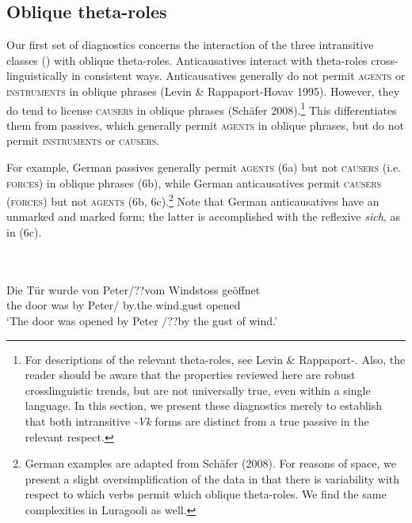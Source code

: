 \documentclass[output=paper]{langsci/langscibook}
\begin{document}
\subsection{Oblique theta-roles} %

Our first set of diagnostics concerns the interaction of the three intransitive classes () with oblique theta-roles. Anticausatives interact with theta-roles cross-linguistically in consistent ways. Anticausatives generally do not permit \textsc{agents }or \textsc{instruments }in oblique phrases (Levin \& Rappaport-Hovav 1995). However, they do tend to license \textsc{causers} in oblique phrases (Schäfer 2008).\footnote{ For descriptions of the relevant theta-roles, see Levin \& Rappaport-\citet{Hovav1995}. Also, the reader should be aware that the properties reviewed here are robust crosslinguistic trends, but are not universally true, even within a single language. In this section, we present these diagnostics merely to establish that both intransitive \textit{-Vk} forms are distinct from a true passive in the relevant respect.} This differentiates them from passives, which generally permit \textsc{agents} in oblique phrases, but do not permit \textsc{instruments }or \textsc{causers}.

For example, German passives generally permit \textsc{agents (6}a) but not \textsc{causers (}i.e. \textsc{forces}) in oblique phrases\textsc{ }(6b), while German anticausatives permit \textsc{causers} (\textsc{forces}) but not \textsc{agents }(6b, 6c).\footnote{{ }German examples are adapted from Schäfer (2008). For reasons of space, we present a slight oversimplification of the data in that there is variability with respect to which verbs permit which oblique theta-roles. We find the same complexities in Luragooli as well.}\textsuperscript{  }Note that German anticausatives have an unmarked and marked form; the latter is accomplished with the reflexive \textit{sich}, as in (6c).

\ea\label{exx:}
{}\\
\ea\label{ex:}
\\
\gll   Die Tür wurde von Peter/??vom      Windstoss  geöffnet\\
       the door was    by   Peter/     by.the  wind.gust   opened\\
\glt ‘The door was opened by Peter /??by the gust of wind.’
\end{document}
